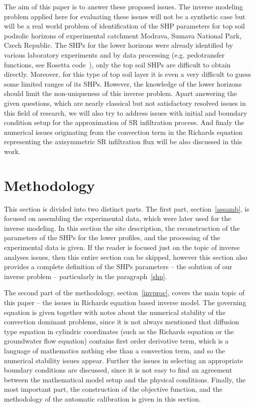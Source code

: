 \documentclass[review]{myarticle}
\begin{document}
The aim of this paper is to answer these proposed issues. The inverse modeling problem applied here for evaluating these issues will not be a synthetic case but will be a real world problem of identification of the SHP parameters for top soil podzolic horizons of experimental catchment Modrava, Sumava National Park, Czech Republic.  The SHPs for the lower horizons were already identified by various laboratory experiments and by data processing (e.g. pedotransfer functions, see Rosetta code~\citep{Schaap}), only the top soil SHPs are difficult to  obtain directly. Moreover, for this type of top soil layer it is even a very difficult to guess some limited ranges of its SHPs. However, the knowledge of the lower horizons should limit the non-uniqueness of this inverse problem. Apart answering the given questions, which are nearly classical but not satisfactory resolved issues in this field of research, we will also try to address issues with initial and boundary condition setup for the approximation of SR infiltration process. And finaly the numerical issues originating from the convection term in the Richards equation representing the axisymmetric SR infiltration flux will be also discussed in this work.









\section{Methodology}%
\label{metodo}

This section is divided into two distinct parts. The first part, section~\ref{assamb}, is focused on assembling the experimental data, which were later used for the inverse modeling. In this section the site description, the reconstruction of the parameters of the SHPs for the lower profiles, and the processing of the experimental data is given.  If the reader is focused just on the topic of inverse analyses issues, then this entire section can be skipped, however this section also provides a complete definition of the SHPs parameters -- the solution of our inverse problem -- particularly in the paragraph~\ref{shp}.

The second part of the methodology, section~\ref{invproc}, covers the main topic of this paper -- the issues in Richards equation based inverse model. The governing equation is given together with  notes about the numerical stability of the convection dominant problems, since it is not always mentioned that diffusion type equation in cylindric coordinates (such as the Richards equation or the groundwater flow equation) contains first order derivative term, which is a language of mathematics nothing else than a convection term, and so the numerical stability issues appear.
Further the issues in selecting an appropriate boundary conditions are discussed, since it is not easy to find an agreement between the mathematical model setup and the physical conditions. Finally, the most important part, the construction of the objective function, and the methodology of the automatic calibration is given in this section. 
\end{document}
